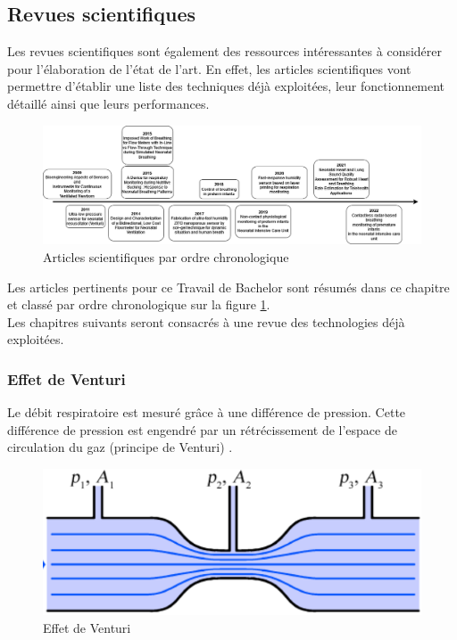 \subsection{Revues scientifiques}
Les revues scientifiques sont également des ressources intéressantes à considérer pour l'élaboration de l'état de l'art. En effet, les 
articles scientifiques vont permettre d'établir une liste des techniques déjà exploitées, leur fonctionnement détaillé ainsi que leurs 
performances. \\
\begin{figure}[H]
    \hspace{-1cm}
    \includegraphics[scale = 0.45]{images/DRP_Etat_de_l_art.png}
    \caption{Articles scientifiques par ordre chronologique}
    \label{fig:articlesChrono}
\end{figure}

Les articles pertinents pour ce Travail de Bachelor sont résumés dans ce chapitre et classé par ordre chronologique sur la figure 
\ref{fig:articlesChrono}. \\

Les chapitres suivants seront consacrés à une revue des technologies déjà exploitées. 

\subsubsection{Effet de Venturi}
Le débit respiratoire est mesuré grâce à une différence de pression. Cette différence de pression est engendré par un rétrécissement de 
l'espace de circulation du gaz (principe de Venturi) \cite{oberg_biomedical_2011}. 
\begin{figure}[H]
    \centering
    \includegraphics[scale = 0.5]{assets/figures/Venturi.png}
    \caption{Effet de Venturi \cite{oberg_biomedical_2011}}
    \label{fig:venturi}
\end{figure}

